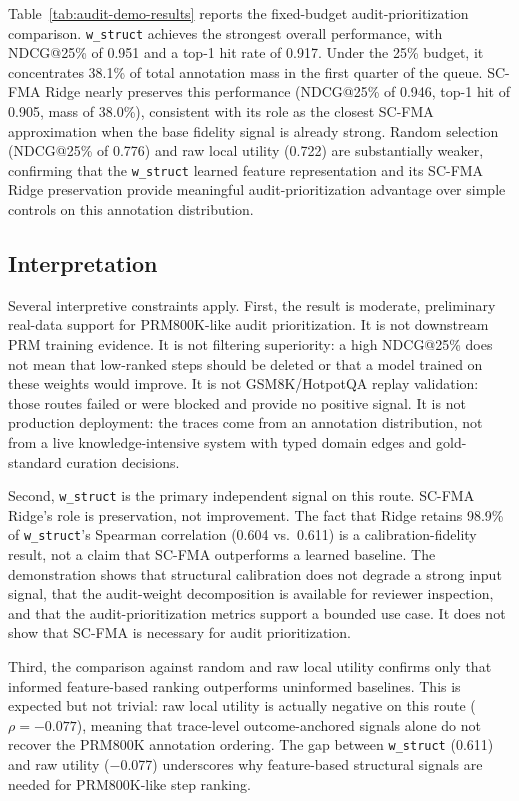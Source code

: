\documentclass[a4paper,fleqn]{cas-sc}
\begin{document}
Table~\ref{tab:audit-demo-results} reports the fixed-budget audit-prioritization comparison. \texttt{w\_struct} achieves the strongest overall performance, with NDCG@25\% of 0.951 and a top-1 hit rate of 0.917. Under the 25\% budget, it concentrates 38.1\% of total annotation mass in the first quarter of the queue. SC-FMA Ridge nearly preserves this performance (NDCG@25\% of 0.946, top-1 hit of 0.905, mass of 38.0\%), consistent with its role as the closest SC-FMA approximation when the base fidelity signal is already strong. Random selection (NDCG@25\% of 0.776) and raw local utility (0.722) are substantially weaker, confirming that the \texttt{w\_struct} learned feature representation and its SC-FMA Ridge preservation provide meaningful audit-prioritization advantage over simple controls on this annotation distribution.

\subsection{Interpretation}
\label{sec:audit-interpretation}

Several interpretive constraints apply. First, the result is moderate, preliminary real-data support for PRM800K-like audit prioritization. It is not downstream PRM training evidence. It is not filtering superiority: a high NDCG@25\% does not mean that low-ranked steps should be deleted or that a model trained on these weights would improve. It is not GSM8K/HotpotQA replay validation: those routes failed or were blocked and provide no positive signal. It is not production deployment: the traces come from an annotation distribution, not from a live knowledge-intensive system with typed domain edges and gold-standard curation decisions.

Second, \texttt{w\_struct} is the primary independent signal on this route. SC-FMA Ridge's role is preservation, not improvement. The fact that Ridge retains 98.9\% of \texttt{w\_struct}'s Spearman correlation (0.604 vs.\ 0.611) is a calibration-fidelity result, not a claim that SC-FMA outperforms a learned baseline. The demonstration shows that structural calibration does not degrade a strong input signal, that the audit-weight decomposition is available for reviewer inspection, and that the audit-prioritization metrics support a bounded use case. It does not show that SC-FMA is necessary for audit prioritization.

Third, the comparison against random and raw local utility confirms only that informed feature-based ranking outperforms uninformed baselines. This is expected but not trivial: raw local utility is actually negative on this route ($\rho=-0.077$), meaning that trace-level outcome-anchored signals alone do not recover the PRM800K annotation ordering. The gap between \texttt{w\_struct} (0.611) and raw utility ($-$0.077) underscores why feature-based structural signals are needed for PRM800K-like step ranking.
\end{document}
